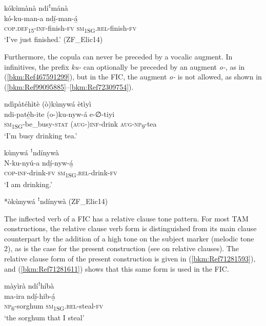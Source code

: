 \ea
\label{bkm:Ref492317885}
kókùmànà ndíꜝmánà\\
\gll kó-ku-man-a    ndí̲-man-á̲\\
\textsc{cop}.\textsc{def}\textsubscript{15}-\textsc{inf}-finish-\textsc{fv}  \textsc{sm}\textsubscript{1SG}.\textsc{rel}-finish-\textsc{fv}\\
\glt ‘I’ve just finished.’ (ZF\_Elic14)
\z

Furthermore, the copula can never be preceded by a vocalic augment. In infinitives, the prefix \textit{ku-} can optionally be preceded by an augment \textit{o-}, as in (\ref{bkm:Ref467591299}), but in the FIC, the augment \textit{o-} is not allowed, as shown in (\ref{bkm:Ref99095885}--\ref{bkm:Ref72309754}).

\ea
\label{bkm:Ref467591299}
ndìpàtéhìtè (ò)kùnywá ètìyì\\
\gll ndi-paté̲h-ite      (o-)ku-nyw-á  e-∅-tiyi\\
\textsc{sm}\textsubscript{1SG}-be\_busy-\textsc{stat}  (\textsc{aug}-)\textsc{inf}-drink  \textsc{aug}-\textsc{np}\textsubscript{9}-tea\\
\glt ‘I’m busy drinking tea.’
\z

\ea
\label{bkm:Ref99095885}
kùnywá ꜝndínywà\\
\gll N-ku-nyú-a    ndí̲-nyw-á̲\\
\textsc{cop}-\textsc{inf}-drink-\textsc{fv}  \textsc{sm}\textsubscript{1SG}.\textsc{rel}-drink-\textsc{fv}\\
\glt ‘I am drinking.’
\z

\ea
\label{bkm:Ref72309754}
*òkùnywá ꜝndínywà (ZF\_Elic14)
\z

The inflected verb of a FIC has a relative clause tone pattern. For most TAM constructions, the relative clause verb form is distinguished from its main clause counterpart by the addition of a high tone on the subject marker (melodic tone 2), as is the case for the present construction (see  on relative clauses). The relative clause form of the present construction is given in (\ref{bkm:Ref71281593}), and (\ref{bkm:Ref71281611}) shows that this same form is used in the FIC.

\ea
\label{bkm:Ref71281593}
màyìrà ndíꜝhíbà\\
\gll ma-ira    ndí̲-hib-á̲\\
\textsc{np}\textsubscript{6}-sorghum  \textsc{sm}\textsubscript{1SG}.\textsc{rel}-steal-\textsc{fv}\\
\glt ‘the sorghum that I steal’
\z

